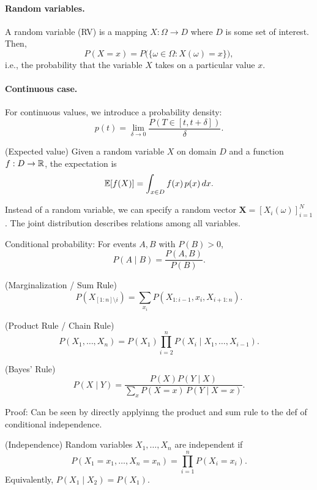 \documentclass[11pt]{article}
\begin{document}
\paragraph{Random variables.}
A random variable (RV) is a mapping $X: \Omega \to D$ where $D$ is some set of interest. Then,
\[
P(X = x) = P\big(\{\omega \in \Omega : X(\omega) = x\}\big),
\]
i.e., the probability that the variable $X$ takes on a particular value $x$.

\paragraph{Continuous case.}
For continuous values, we introduce a probability density:
\[
p(t) = \lim_{\delta \to 0} \frac{P(T \in [t, t + \delta])}{\delta}.
\]

\begin{definition}
(Expected value)  
Given a random variable $X$ on domain $D$ and a function $f: D \to \mathbb{R}$, the expectation is
\[
\mathbb{E}[f(X)] = \int_{x \in D} f(x)\, p(x)\, dx.
\]
\end{definition}

Instead of a random variable, we can specify a random vector $\bm{X} = [X_i(\omega)]_{i=1}^N$.  
The joint distribution describes relations among all variables. 

\begin{definition}
Conditional probability: For events $A, B$ with $P(B) > 0$,
\[
P(A \mid B) = \frac{P(A, B)}{P(B)}.
\]
\end{definition}

\begin{definition}
(Marginalization / Sum Rule)  
\[
P(X_{[1:n] \setminus i}) = \sum_{x_i} P(X_{1:i-1}, x_i, X_{i+1:n}).
\]
\end{definition}

\begin{definition}
(Product Rule / Chain Rule)  
\[
P(X_1, \dots, X_n) = P(X_1) \prod_{i=2}^n P(X_i \mid X_1, \dots, X_{i-1}).
\]
\end{definition}

\begin{theorem}
(Bayes' Rule)  
\[
P(X \mid Y) = \frac{P(X)P(Y \mid X)}{\sum_{x} P(X=x)\,P(Y \mid X=x)}.
\]

Proof: Can be seen by directly applyinng the product and sum rule to the def of conditional independence. 
\end{theorem}

\begin{definition}
(Independence)  
Random variables $X_1, \dots, X_n$ are independent if
\[
P(X_1 = x_1, \dots, X_n = x_n) = \prod_{i=1}^n P(X_i = x_i).
\]
Equivalently, $P(X_1 \mid X_2) = P(X_1)$.
\end{definition}
\end{document}
